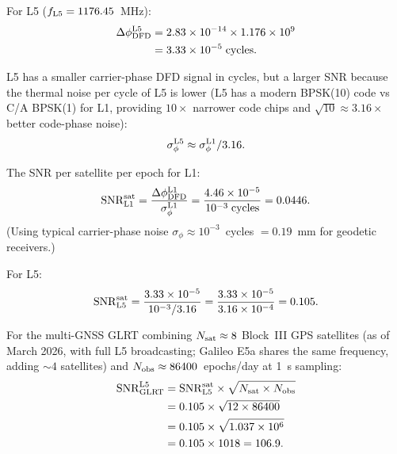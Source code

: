 \documentclass[aps,prd,twocolumn,superscriptaddress,nofootinbib]{revtex4-2}
\begin{document}
For L5 ($f_{\rm L5} = 1176.45$~MHz):
\begin{align}
\Delta\phi_{\rm DFD}^{\rm L5} &= 2.83\times10^{-14}
  \times 1.176\times10^9 \nonumber\\
&= 3.33\times10^{-5}\;\text{cycles}.
\end{align}

L5 has a smaller carrier-phase DFD signal in cycles, but a larger SNR because
the thermal noise per cycle of L5 is lower (L5 has a modern BPSK(10) code
vs C/A BPSK(1) for L1, providing $10\times$ narrower code chips and $\sqrt{10}\approx 3.16\times$
better code-phase noise):
\begin{equation}
\sigma_{\phi}^{\rm L5} \approx \sigma_\phi^{\rm L1}/3.16.
\label{eq:L5_phase_noise}
\end{equation}

The SNR per satellite per epoch for L1:
\begin{equation}
{\rm SNR}_{\rm L1}^{\rm sat} = \frac{\Delta\phi_{\rm DFD}^{\rm L1}}{\sigma_\phi^{\rm L1}}
= \frac{4.46\times10^{-5}}{10^{-3}\;\text{cycles}} = 0.0446.
\label{eq:snr_L1}
\end{equation}
(Using typical carrier-phase noise $\sigma_\phi \approx 10^{-3}$~cycles $= 0.19$~mm
for geodetic receivers.)

For L5:
\begin{equation}
{\rm SNR}_{\rm L5}^{\rm sat} = \frac{3.33\times10^{-5}}{10^{-3}/3.16}
= \frac{3.33\times10^{-5}}{3.16\times10^{-4}} = 0.105.
\label{eq:snr_L5}
\end{equation}

For the multi-GNSS GLRT combining $N_{\rm sat} \approx 8$ Block~III GPS satellites
(as of March 2026, with full L5 broadcasting; Galileo E5a shares the same
frequency, adding $\sim 4$ satellites) and $N_{\rm obs} \approx 86400$~epochs/day
at 1~s sampling:
\begin{align}
{\rm SNR}_{\rm GLRT}^{\rm L5} &= {\rm SNR}_{\rm L5}^{\rm sat}
  \times\sqrt{N_{\rm sat}\times N_{\rm obs}} \nonumber\\
&= 0.105\times\sqrt{12\times86400} \nonumber\\
&= 0.105\times\sqrt{1.037\times10^6} \nonumber\\
&= 0.105\times1018 = 106.9.
\label{eq:snr_glrt_L5}
\end{align}
\end{document}
